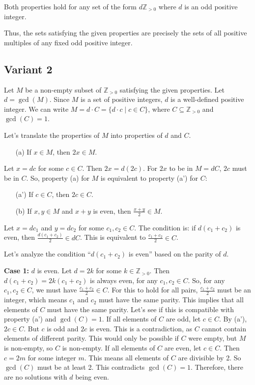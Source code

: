 \documentclass[12pt,a4paper]{article}
\theoremstyle{definition}
\begin{document}
        Both properties hold for any set of the form $d\mathbb{Z}_{>0}$ where $d$ is an odd positive integer.

        Thus, the sets satisfying the given properties are precisely the sets of all positive multiples of any fixed odd positive integer.

\subsection{Variant 2}
    Let $M$ be a non-empty subset of $\mathbb{Z}_{>0}$ satisfying the given properties.
    Let $d = \gcd(M)$. Since $M$ is a set of positive integers, $d$ is a well-defined positive integer.
    We can write $M = d \cdot C = \{d \cdot c \mid c \in C\}$, where $C \subseteq \mathbb{Z}_{>0}$ and $\gcd(C) = 1$.

    Let's translate the properties of $M$ into properties of $d$ and $C$.
    \begin{enumerate}
        \item[(a)] If $x \in M$, then $2x \in M$.
    \end{enumerate}
    Let $x = dc$ for some $c \in C$. Then $2x = d(2c)$.
    For $2x$ to be in $M=dC$, $2c$ must be in $C$.
    So, property (a) for $M$ is equivalent to property (a') for $C$:
    \begin{enumerate}
        \item[(a')] If $c \in C$, then $2c \in C$.
    \end{enumerate}

    \begin{enumerate}
        \item[(b)] If $x,y \in M$ and $x+y$ is even, then $\frac{x+y}{2} \in M$.
    \end{enumerate}
    Let $x=dc_1$ and $y=dc_2$ for some $c_1, c_2 \in C$.
    The condition is: if $d(c_1+c_2)$ is even, then $\frac{d(c_1+c_2)}{2} \in dC$.
    This is equivalent to $\frac{c_1+c_2}{2} \in C$.

    Let's analyze the condition ``$d(c_1+c_2)$ is even'' based on the parity of $d$.

    \textbf{Case 1:} $d$ is even.
    Let $d=2k$ for some $k \in \mathbb{Z}_{>0}$.
    Then $d(c_1+c_2) = 2k(c_1+c_2)$ is always even, for any $c_1, c_2 \in C$.
    So, for any $c_1, c_2 \in C$, we must have $\frac{c_1+c_2}{2} \in C$.
    For this to hold for all pairs, $\frac{c_1+c_2}{2}$ must be an integer, which means $c_1$ and $c_2$ must have the same parity.
    This implies that all elements of $C$ must have the same parity.
    Let's see if this is compatible with property (a') and $\gcd(C)=1$.
    If all elements of $C$ are odd, let $c \in C$. By (a'), $2c \in C$. But $c$ is odd and $2c$ is even. This is a contradiction, as $C$ cannot contain elements of different parity. This would only be possible if $C$ were empty, but $M$ is non-empty, so $C$ is non-empty.
    If all elements of $C$ are even, let $c \in C$. Then $c=2m$ for some integer $m$. This means all elements of $C$ are divisible by 2. So $\gcd(C)$ must be at least 2. This contradicts $\gcd(C)=1$.
    Therefore, there are no solutions with $d$ being even.
\end{document}

